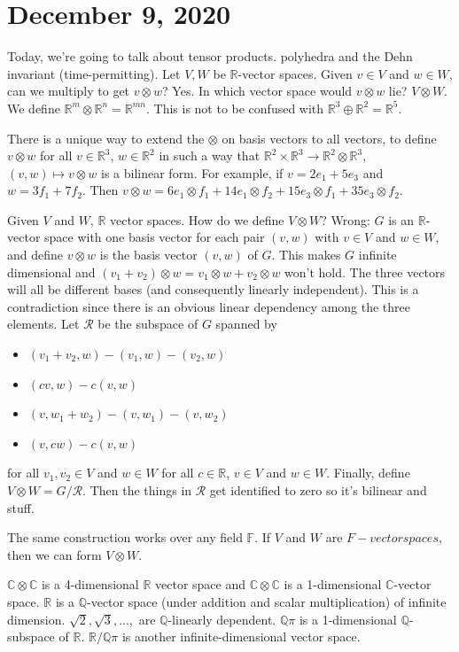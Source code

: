 \documentclass{article}
\newcommand{\C}{\mathbb{C}}
\newcommand{\Q}{\mathbb{Q}}
\newcommand{\R}{\mathbb{R}}
\newcommand{\ra}[1][]{\xrightarrow{#1}}
\begin{document}
\section{December 9, 2020}
Today, we're going to talk about tensor products. polyhedra and the Dehn invariant (time-permitting).
Let $V,W$ be $\R$-vector spaces. Given $v\in V$ and $w\in W$, can we multiply to get $v\otimes w$? Yes. In which vector space would $v\otimes w$ lie? $V\otimes W$. We define $\R^m\otimes \R^n=\R^{mn}$. This is not to be confused with $\R^3\oplus \R^2=\R^5$.

There is a unique way to extend the $\otimes$ on basis vectors to all vectors, to define $v\otimes w$ for all $v\in \R^3$, $w\in \R^2$ in such a way that $\R^2\times \R^3\ra \R^2\otimes \R^3$, $(v,w)\mapsto v\otimes w$ is a bilinear form. For example, if $v=2e_1+5e_3$ and $w=3f_1+7f_2$. Then $v\otimes w=6e_1\otimes f_1+14e_1\otimes f_2+15e_3\otimes f_1 + 35e_3\otimes f_2$. 

Given $V$ and $W$, $\R$ vector spaces. How do we define $V\otimes W$? 
Wrong: $G$ is an $\R$-vector space with one basis vector for each pair $(v,w)$ with $v\in V$ and $w\in W$, and define $v\otimes w$ is the basis vector $(v,w)$ of $G$. This makes $G$ infinite dimensional and $(v_1+v_2)\otimes w=v_1\otimes w+v_2\otimes w$ won't hold. The three vectors will all be different bases (and consequently linearly independent). This is a contradiction since there is an obvious linear dependency among the three elements. Let $\mathcal R$ be the subspace of $G$ spanned by 
\begin{itemize}
    \item $(v_1+v_2,w)-(v_1,w)-(v_2,w)$
    \item $(cv,w)-c(v,w)$
    \item $(v,w_1+w_2)-(v,w_1)-(v,w_2)$
    \item $(v,cw)-c(v,w)$
\end{itemize} 
for all $v_1,v_2\in V$ and $w\in W$ for all $c\in \R$, $v\in V$ and $w\in W$. Finally, define $V\otimes W=G/\mathcal R$. Then the things in $\mathcal R$ get identified to zero so it's bilinear and stuff. 

The same construction works over any field $\mathbb F$. If $V$ and $W$ are $F-vector spaces$, then we can form $V\otimes W$. 
\begin{example}
$\C\otimes\C$ is a 4-dimensional $\R$ vector space and $\C\otimes \C$ is a 1-dimensional $\C$-vector space. $\R$ is a $\Q$-vector space (under addition and scalar multiplication) of infinite dimension. $\sqrt2, \sqrt3,...,$ are $\Q$-linearly dependent. $\Q\pi$ is a 1-dimensional $\Q$-subspace of $\R$. $\R/\Q\pi$ is another infinite-dimensional vector space.
\end{example}
\end{document}
